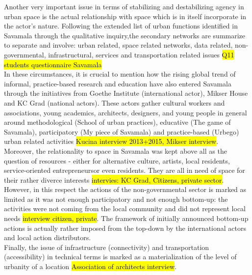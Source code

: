 \documentclass[11pt]{report}
\begin{document}
Another very important issue in terms of stabilizing and destabilizing agency in urban space is the actual relationship with space which is in itself incorporate in the actor's nature. Following the extended list of urban functions identified in Savamala through the qualitative inquiry,\footnotemark the secondary networks are summarize to separate and involve: urban related, space related networks, data related, non-governmental, infrastructural, services and transportation related issues
\hl{Q11 students questionnaire Savamala}
\\
In these circumstances, it is crucial to mention how the rising global trend of informal, practice-based research and education have also entered Savamala through the initiatives from Goethe Institute (international actor), Mikser House and KC Grad (national actors). These actors gather cultural workers and associations, young academics, architects, designers, and young people in general around methodological (School of urban practices), educative (The game of Savamala), participatory (My piece of Savamala) and practice-based (Urbego) urban related activities \hl{Kucina interview 2013+2015, Mikser interview}.
\\
Moreover, the relationality to space in Savamala was kept above all as the question of resources - either for alternative culture, artists, local residents, service-oriented entrepreneurs\footnotemark or even residents.  They are all in need of space for their rather diverce interests \hl{intervies: KC Grad, Citizens, private sector}.
However, in this respect the actions of the non-governmental sector is marked as limited as it was not enough participatory  and not enough bottom-up: the activities were not coming from the local community and did not represent local needs \hl{interview citizen, private}. The framework of initially announced bottom-up actions is actually rather imposed from the top-down by the international actors and local action distributors.
\\
Finally, the issue of infrastructure (connectivity) and transportation (accessibility) in technical terms is marked as a materialization of the level of urbanity of a location \hl{Association of architects interview}. 
\end{document}
